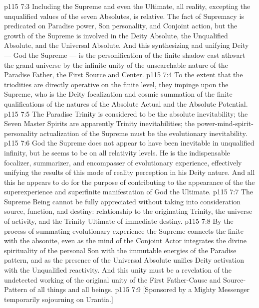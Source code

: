 \vs p115 7:3 \pc Including the Supreme and even the Ultimate, all reality, excepting the unqualified values of the seven Absolutes, is relative. The fact of Supremacy is predicated on Paradise power, Son personality, and Conjoint action, but the growth of the Supreme is involved in the Deity Absolute, the Unqualified Absolute, and the Universal Absolute. And this synthesizing and unifying Deity --- God the Supreme --- is the personification of the finite shadow cast athwart the grand universe by the infinite unity of the unsearchable nature of the Paradise Father, the First Source and Center.
\vs p115 7:4 To the extent that the triodities are directly operative on the finite level, they impinge upon the Supreme, who is the Deity focalization and cosmic summation of the finite qualifications of the natures of the Absolute Actual and the Absolute Potential.
\vs p115 7:5 \pc The Paradise Trinity is considered to be the absolute inevitability; the Seven Master Spirits are apparently Trinity inevitabilities; the power\hyp{}mind\hyp{}spirit\hyp{}personality actualization of the Supreme must be the evolutionary inevitability.
\vs p115 7:6 God the Supreme does not appear to have been inevitable in unqualified infinity, but he seems to be on all relativity levels. He is the indispensable focalizer, summarizer, and encompasser of evolutionary experience, effectively unifying the results of this mode of reality perception in his Deity nature. And all this he appears to do for the purpose of contributing to the appearance of the  the superexperience and superfinite manifestation of God the Ultimate.
\vs p115 7:7 The Supreme Being cannot be fully appreciated without taking into consideration source, function, and destiny: relationship to the originating Trinity, the universe of activity, and the Trinity Ultimate of immediate destiny.
\vs p115 7:8 By the process of summating evolutionary experience the Supreme connects the finite with the absonite, even as the mind of the Conjoint Actor integrates the divine spirituality of the personal Son with the immutable energies of the Paradise pattern, and as the presence of the Universal Absolute unifies Deity activation with the Unqualified reactivity. And this unity must be a revelation of the undetected working of the original unity of the First Father\hyp{}Cause and Source\hyp{}Pattern of all things and all beings.
\vsetoff
\vs p115 7:9 [Sponsored by a Mighty Messenger temporarily sojourning on Urantia.]
